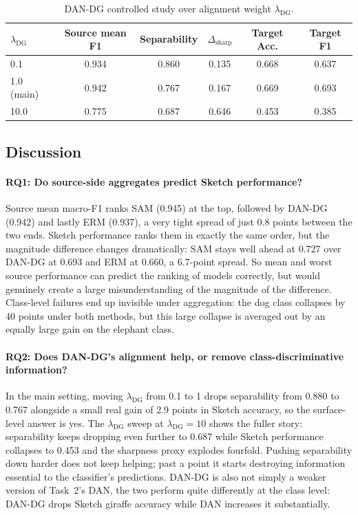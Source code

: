 \documentclass{article}
\begin{document}
\begin{table}[t]
  \caption{DAN-DG controlled study over alignment weight $\lambda_\text{DG}$.}
  \label{tab:t3-controlled}
  \centering
  \footnotesize
  \begin{tabular}{lccccc}
    \toprule
    $\lambda_\text{DG}$ & Source mean F1 & Separability & $\Delta_\text{sharp}$ & Target Acc. & Target F1 \\
    \midrule
    0.1            & 0.934 & 0.860 & 0.135 & 0.668 & 0.637 \\
    1.0 (main)     & 0.942 & 0.767 & 0.167 & 0.669 & 0.693 \\
    10.0           & 0.775 & 0.687 & 0.646 & 0.453 & 0.385 \\
    \bottomrule
  \end{tabular}
\end{table}

\subsection{Discussion}

\paragraph{RQ1: Do source-side aggregates predict Sketch performance?}

Source mean macro-F1 ranks SAM (0.945) at the top, followed by DAN-DG (0.942) and lastly ERM (0.937), a very tight spread of just 0.8 points between the two ends. Sketch performance ranks them in exactly the same order, but the magnitude difference changes dramatically: SAM stays well ahead at 0.727 over DAN-DG at 0.693 and ERM at 0.660, a 6.7-point spread. So mean and worst source performance can predict the ranking of models correctly, but would genuinely create a large misunderstanding of the magnitude of the difference. Class-level failures end up invisible under aggregation: the dog class collapses by 40 points under both methods, but this large collapse is averaged out by an equally large gain on the elephant class.

\paragraph{RQ2: Does DAN-DG's alignment help, or remove class-discriminative information?}

In the main setting, moving $\lambda_\text{DG}$ from 0.1 to 1 drops separability from 0.880 to 0.767 alongside a small real gain of 2.9 points in Sketch accuracy, so the surface-level answer is yes. The $\lambda_\text{DG}$ sweep at $\lambda_\text{DG}=10$ shows the fuller story: separability keeps dropping even further to 0.687 while Sketch performance collapses to 0.453 and the sharpness proxy explodes fourfold. Pushing separability down harder does not keep helping; past a point it starts destroying information essential to the classifier's predictions. DAN-DG is also not simply a weaker version of Task~2's DAN, the two perform quite differently at the class level: DAN-DG drops Sketch giraffe accuracy while DAN increases it substantially.
\end{document}
